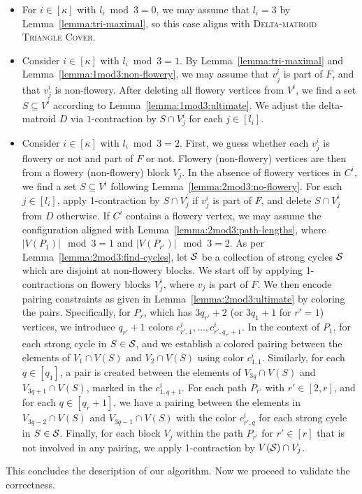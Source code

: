 \begin{itemize}
  \item For $i \in [\kappa]$ with $l_i \bmod 3 = 0$, we may assume that $l_i = 3$ by Lemma~\ref{lemma:tri-maximal}, so this case aligns with \textsc{Delta-matroid Triangle Cover}.
  \item Consider $i \in [\kappa]$ with $l_i \bmod 3 = 1$.
  By Lemma~\ref{lemma:tri-maximal} and Lemma~\ref{lemma:1mod3:non-flowery}, we may assume that $v_j^i$ is part of $F$, and that $v_j^i$ is non-flowery.
  After deleting all flowery vertices from $V^i$, we find a set $S \subseteq V^i$ according to Lemma~\ref{lemma:1mod3:ultimate}.
  We adjust the delta-matroid $D$ via $1$-contraction by $S \cap V_j^i$ for each $j \in [l_i]$.
  \item
  Consider $i \in [\kappa]$ with $l_i \bmod 3 = 2$.
  First, we guess whether each $v^i_j$ is flowery or not and part of $F$ or not.
  Flowery (non-flowery) vertices are then from a flowery (non-flowery) block $V_j$.
  In the absence of flowery vertices in $C^i$, we find a set $S \subseteq V^i$ following Lemma~\ref{lemma:2mod3:no-flowery}.
  For each $j \in [l_i]$, apply 1-contraction by $S \cap V_j^i$ if $v^i_j$ is part of $F$, and delete $S \cap V_j^i$ from $D$ otherwise.
  If $C^i$ contains a flowery vertex, we may assume the configuration aligned with Lemma~\ref{lemma:2mod3:path-lengths}, where $|V(P_1)| \mod 3 = 1$ and $|V(P_{r'})| \mod 3 = 2$.
  As per Lemma~\ref{lemma:2mod3:find-cycles}, let $\mathcal S$ be a collection of strong cycles $\mathcal S$ which are disjoint at non-flowery blocks.
  We start off by applying 1-contractions on flowery blocks $V^i_j$, where $v_j$ is part of $F$.
  We then encode pairing constraints as given in Lemma~\ref{lemma:2mod3:ultimate} by coloring the pairs.
  Specifically, for $P_r$, which has $3q_{r'} + 2$ (or $3q_1 +1$ for $r' = 1$) vertices, we introduce $q_{r'} + 1$ colors $c^i_{r',1}, \dots, c^i_{r',q_{r'}+1}$.
  In the context of $P_1$, for each strong cycle in $S \in \mathcal S$, and we establish a colored pairing between the elements of $V_1 \cap V(S)$ and $V_2 \cap V(S)$ using color $c^i_{1,1}$.
  Similarly, for each $q \in [q_1]$, a pair is created between the elements of $V_{3q} \cap V(S)$ and $V_{3q+1} \cap V(S)$, marked in the $c^i_{1,q+1}$.
  For each path $P_{r'}$ with $r' \in [2, r]$, and for each $q \in [q_r+1]$, we have a pairing between the elements in $V_{3q-2} \cap V(S)$ and $V_{3q-1} \cap V(S)$ with the color $c^i_{r',q}$ for each strong cycle in $S \in \mathcal S$.
  Finally, for each block $V_j$ within the path $P_{r'}$ for $r' \in [r]$ that is not involved in any pairing, we apply 1-contraction by $V(\mathcal S) \cap V_j$. 
\end{itemize}
This concludes the description of our algorithm.
Now we proceed to validate the correctness.

